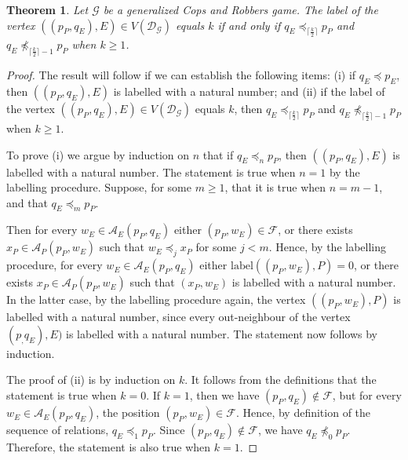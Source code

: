 \documentclass[12pt,reqno]{amsart}
\newtheorem{theorem}{Theorem}
\begin{document}
\smallskip
\begin{theorem}
Let $\mathcal{G}$ be a generalized Cops and Robbers game. The label of the vertex $((p_P, q_E), E) \in V(\mathcal{D}_\mathcal{G})$ equals $k$ if and only if $q_E \preceq_{\lceil \frac{k}{2} \rceil}
p_P$ and $q_E \not\preceq_{\lceil \frac{k}{2} \rceil - 1} p_P$  when $k \geq 1$. \label{RelationIndex}
\end{theorem}
\begin{proof}
 The result will follow if we can establish the following items: (i) if $q_E \preceq p_E$, then $((p_P, q_E), E)$ is labelled with a natural number; and (ii) if the label of the vertex $((p_P, q_E),
E) \in V(\mathcal{D}_\mathcal{G})$ equals $k$, then  $q_E \preceq_{\lceil \frac{k}{2} \rceil} p_P$ and $q_E \not\preceq_{\lceil \frac{k}{2} \rceil - 1} p_P$  when $k \geq 1$.%

To prove (i) we argue by induction on $n$ that if $q_E \preceq_n p_P$, then $((p_P, q_E), E)$ is labelled with a natural number. The statement is true when $n=1$ by the labelling procedure.  Suppose,
for some $m \geq 1$, that it is true when $n=m-1$, and that  $q_E \preceq_m p_P$.

Then for every $w_E \in \mathcal{A}_E(p_P, q_E)$ either $(p_P, w_E) \in \mathcal{F}$, or there exists $x_P \in \mathcal{A}_P(p_P, w_E)$ such that $w_E \preceq_j x_P$ for some $j < m$.  Hence, by the
labelling procedure, for every $w_E \in \mathcal{A}_E(p_P, q_E)$ either $\mathrm{label}((p_P, w_E), P) = 0$, or there exists $x_P \in \mathcal{A}_P(p_P, w_E)$ such that $(x_P, w_E)$ is labelled with
a natural number. In the latter case, by the labelling procedure again, the vertex $((p_P, w_E), P)$ is labelled with a natural number,  since every out-neighbour of the vertex $(p_, q_E), E)$ is
labelled with a natural number.  The statement now follows by induction.

The proof of (ii)  is by induction on $k$.   It follows from the definitions that the statement is true when $k = 0$.  If $k = 1$, then we have $(p_P, q_E) \not\in \mathcal{F}$, but
for every $w_E \in \mathcal{A}_E(p_P, q_E)$, the position $(p_P, w_E) \in \mathcal{F}$.
Hence, by definition of the sequence of relations,
$q_E \preceq_1 p_P$.  Since $(p_P, q_E) \not\in \mathcal{F}$, we have $q_E \not\preceq_{0} p_P$.  Therefore, the statement is also true when $k = 1$.


\end{proof}
\end{document}
